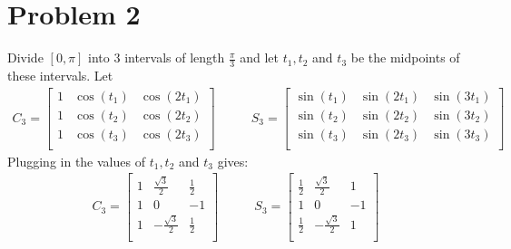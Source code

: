 \documentclass[paper=a4, fontsize=11pt]{scrartcl} %
\numberwithin{equation}{section} %
\numberwithin{figure}{section} %
\numberwithin{table}{section} %
\theoremstyle{definition}
\begin{document}
\section*{Problem 2}
Divide $\left[ 0, \pi \right]$ into 3 intervals of length $\frac{\pi}{3}$ and let $t_1, t_2$ and $t_3$ be the midpoints of these intervals.
Let
\begin{align*}
C_3 =  
  \begin{bmatrix}
   1 & \cos (t_1) & \cos (2t_1) \\
   1 & \cos (t_2) & \cos (2t_2) \\
   1 & \cos (t_3) & \cos (2t_3) \\
  \end{bmatrix} & \qquad S_3 = 
  \begin{bmatrix}
   \sin (t_1) & \sin (2t_1) & \sin (3t_1) \\
   \sin (t_2) & \sin (2t_2) & \sin (3t_2) \\
   \sin (t_3) & \sin (2t_3) & \sin (3t_3) \\
  \end{bmatrix}
\end{align*}
Plugging in the values of $t_1, t_2$ and $t_3$ gives: 
\begin{align*}
  C_3 = 
  \begin{bmatrix}
  1 & \frac{\sqrt{3}}{2} & \frac{1}{2}\\
  1 & 0 & -1 \\
  1 & -\frac{\sqrt{3}}{2} & \frac{1}{2} \\
\end{bmatrix} & \qquad S_3 = 
\begin{bmatrix}
  \frac{1}{2} & \frac{\sqrt{3}}{2} & 1 \\
  1 & 0 & -1 \\
  \frac{1}{2} & -\frac{\sqrt{3}}{2} & 1\\
\end{bmatrix}
\end{align*}
\end{document}
